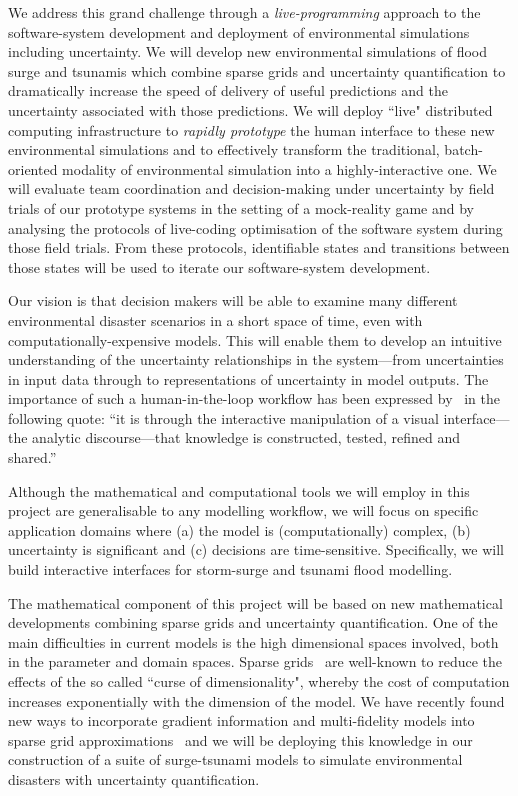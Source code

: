 \documentclass[a4paper,fontsize=13pt]{scrartcl}
\begin{document}
We address this grand
challenge through a {\em live-programming} approach to the software-system development
and deployment of  environmental simulations including uncertainty. 
We will develop new environmental simulations of flood surge and tsunamis which combine sparse grids and uncertainty quantification to dramatically increase the speed of delivery of useful predictions and the uncertainty associated with those predictions.
We will deploy  ``live"  distributed
computing infrastructure to {\em rapidly prototype} the human interface to these new environmental simulations and to effectively transform the
traditional, batch-oriented modality of environmental simulation into a highly-interactive one. We will 
evaluate team coordination and decision-making under uncertainty by field trials of our prototype systems in the setting of a mock-reality game and by analysing the protocols of live-coding optimisation of the software system during those field trials. From these protocols, identifiable states and transitions between those states will be used to iterate our software-system development. 

Our vision is that decision makers
will be able to examine many different environmental disaster scenarios in a short space of
time, even with computationally-expensive models. This will enable
them to develop an intuitive understanding of the uncertainty
relationships in the system---from uncertainties in input data through
to representations of uncertainty in model outputs. The importance of
such a human-in-the-loop workflow has been expressed
by~\textcite{pike_science_2009} in the following quote: ``it is through the interactive
manipulation of a visual interface---the analytic discourse---that
knowledge is constructed, tested, refined and shared.''

Although the mathematical and computational tools we will employ in
this project are generalisable to any modelling workflow, we will
focus on specific application domains where (a) the model is (computationally)
complex, (b) uncertainty is significant and (c) decisions are
time-sensitive. Specifically, we will build interactive interfaces for
 storm-surge and tsunami flood modelling. 

The mathematical component of this project will be based on new
mathematical developments combining sparse grids and uncertainty
quantification. One of the main difficulties in current models is the
high dimensional spaces involved, both in the parameter and
domain spaces. Sparse grids~\parencite{BungartzGriebel2004} are
well-known to reduce the effects of the so called ``curse of
dimensionality", whereby the cost of computation increases
exponentially with the dimension of the model.
We have recently found new ways to incorporate gradient
information and multi-fidelity models into sparse grid
approximations~\parencite{deBaarHarding2015,Jakeman2015,deBaarRDM2015} and we will be
deploying this knowledge in our construction of a suite of surge-tsunami models to simulate
environmental disasters with uncertainty quantification.
\end{document}
